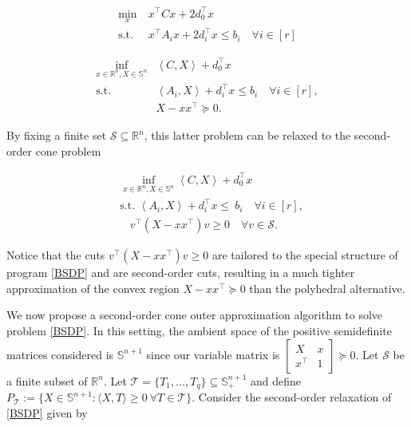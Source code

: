 \documentclass{article}
\begin{document}
\begin{equation} 
\label{qcqp_prob}
\begin{aligned}
\min_{x } & \  x^\top C x + 2d_0^\top x \\ 
\text{s.t. }& \ x^\top A_i x + 2d_i^\top x \leq b_i \quad \forall i \in [r]
\end{aligned}
\end{equation}

\begin{equation} 
\label{qcqp_prob_shor}
\begin{aligned}
\inf_{x \in \mathbb{R}^n, X\in \mathbb{S}^n} & \left \langle C,X \right \rangle + d_0^\top x  \\
 \text{s.t. } & \left \langle A_i,X \right \rangle +  d_i^\top x\leq  b_i \quad \forall i \in [r], \\ 
& X-xx^\top \succeq 0.
\end{aligned}     
\end{equation}

By fixing a finite set $\mathcal{S}\subseteq \mathbb{R}^n$, this latter problem can be relaxed to the second-order cone problem 

\begin{equation}\label{shor_soc}
\begin{aligned}
&\inf_{x \in \mathbb{R}^n, X\in \mathbb{S}^n}  \left \langle C,X \right \rangle + d_0^\top x  \\
   & \text{s.t. }   \left \langle A_i,X \right \rangle +  d_i^\top x\leq  \ b_i \quad \forall i \in [r], \\ 
 &  \ \ \ \ v^\top \left  (X-xx^\top\right)v \geq 0 \quad \forall   v\in \mathcal{S}.
\end{aligned}     
\end{equation}


Notice that the cuts $ v^\top \left  (X-xx^\top\right)v \geq 0$ are tailored to the special structure of program \eqref{BSDP} and are second-order cuts, resulting in a much tighter approximation of the convex region $X-xx^\top \succeq 0$ than the polyhedral alternative.

We now propose a second-order cone outer approximation algorithm to solve problem \eqref{BSDP}. In this setting, the ambient space of the positive semidefinite matrices considered is $\mathbb{S}^{n+1}$ since our variable matrix is $\begin{bmatrix}
X & x \\
x^\top & 1 
\end{bmatrix} \succeq 0$. Let $\mathcal{S}$ be a finite subset of $\mathbb{R}^n$. Let $\mathcal{T} = \{T_1,\dots,T_q\}\subseteq \mathbb{S}^{n+1}_+$ and define 
$P_{\mathcal{T}}:= \{X \in \mathbb{S}^{n+1}: \langle X, T \rangle \geq 0 \ \forall T \in \mathcal{T} \} $. Consider the second-order relaxation of \eqref{BSDP} given by
\end{document}

